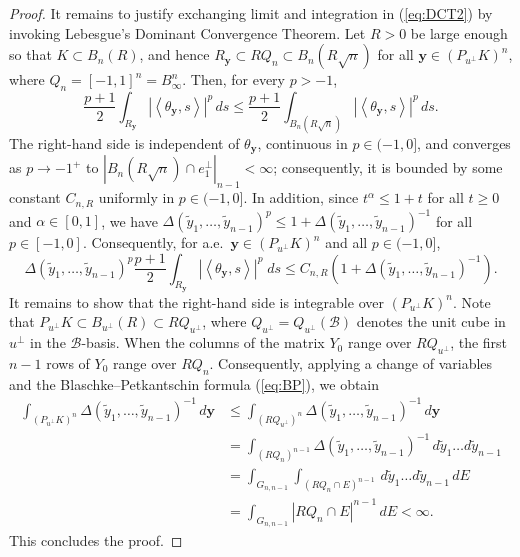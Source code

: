 \documentclass[11pt]{article}
\theoremstyle{definition}
\theoremstyle{proof}
\DeclareMathOperator{\+}{\mathop{\tilde{+}}}
\newcommand{\abs}[1]{\left\vert#1\right\vert}
\newcommand{\scalar}[1]{\left \langle #1 \right \rangle}
\newcommand{\Y}{Y}\newcommand{\E}{\mathbb{E}}
\newcommand{\y}{\mathbf{y}}
\numberwithin{equation}{section}
\numberwithin{equation}{section}
\begin{document}
\begin{proof}
It remains to justify exchanging limit and integration in (\ref{eq:DCT2}) by invoking Lebesgue's Dominant Convergence Theorem. Let $R > 0$ be large enough so that $K \subset B_n(R)$, and hence $R_{\y} \subset R Q_n \subset B_n(R \sqrt{n})$ for all $\y \in  (P_{u^{\perp}} K)^n$, where $Q_n = [-1,1]^n = B_\infty^n$. Then, for every $p > -1$,
\[
\frac{p+1}{2} \int_{R_\y} \abs{\scalar{\theta_\y,s}}^p \, ds \leq \frac{p+1}{2} \int_{B_n(R \sqrt{n})} \abs{\scalar{\theta_\y,s}}^p \, ds .
\]
The right-hand side is independent of $\theta_\y$, continuous in $p \in (-1,0]$, and converges as $p \rightarrow -1^+$ to $|B_n(R \sqrt{n}) \cap e_1^{\perp}|_{n-1} < \infty$; consequently, it is bounded by some constant $C_{n,R}$ uniformly in $p \in (-1,0]$. 
In addition, since $t^\alpha \leq 1 + t$ for all $t \geq 0$ and $\alpha \in [0,1]$, we have $\Delta(\tilde y_1,\ldots,\tilde y_{n-1})^p \leq 1 + \Delta(\tilde y_1,\ldots,\tilde y_{n-1})^{-1}$ for all $p \in [-1,0]$. Consequently, for a.e.~$\y \in  (P_{u^{\perp}} K)^n$ and all $p \in (-1,0]$,
\[
\Delta(\tilde y_1,\ldots,\tilde y_{n-1})^p \frac{p+1}{2} \int_{R_\y} \abs{\scalar{\theta_\y,s}}^p \;  ds \leq C_{n,R} (1 + \Delta(\tilde y_1,\ldots,\tilde y_{n-1})^{-1}) . 
\]
It remains to show that the right-hand side is integrable over $(P_{u^{\perp}} K)^n$. Note that $P_{u^{\perp}} K \subset B_{u^{\perp}}(R) \subset R Q_{u^{\perp}}$, where $Q_{u^{\perp}} = Q_{u^{\perp}}(\mathcal{B})$ denotes the unit cube in $u^{\perp}$ in the $\mathcal{B}$-basis. When the columns of the matrix $\Y_0$ range over $R Q_{u^{\perp}}$, the first $n-1$ rows of $\Y_0$ range over $R Q_n$. Consequently, applying a change of variables and the Blaschke--Petkantschin formula (\ref{eq:BP}), we obtain 
\begin{align*}
\int_{(P_{u^{\perp}} K)^n} \Delta(\tilde y_1,\ldots,\tilde y_{n-1})^{-1} \, d\y & \leq \int_{(R Q_{u^{\perp}})^n} \Delta(\tilde y_1,\ldots,\tilde y_{n-1})^{-1} \, d\y \\
& = \int_{(R Q_n)^{n-1}} \Delta(\tilde y_1,\ldots,\tilde y_{n-1})^{-1} \, d\tilde y_1 \ldots d\tilde y_{n-1} \\
& =  \int_{G_{n,n-1}} \int_{(R Q_n \cap E)^{n-1}} \, d\tilde y_1 \ldots d\tilde y_{n-1} \, dE \\
& = \int_{G_{n,n-1}} |R Q_n \cap E|^{n-1} \, dE < \infty . 
\end{align*}
This concludes the proof. 
\end{proof}
\end{document}
